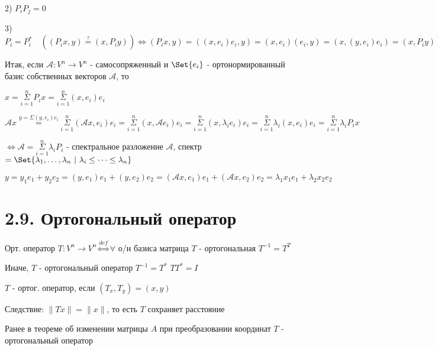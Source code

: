 \documentclass[12pt]{article}
\begin{document}
    2) $\displaystyle P_i P_j = 0$

    3) $\displaystyle P_i = P_i^* \quad ((P_i x, y) \stackrel{?}{=} (x, P_i y)) \Longleftrightarrow (P_i x, y) = ((x, e_i) e_i, y) = (x, e_i) (e_i, y) = (x, (y, e_i) e_i) = (x, P_i y)$

    Итак, если $\displaystyle \mathcal{A}: V^n \to V^n$ - самосопряженный и $\displaystyle \Set{e_i}$ - ортонормированный базис собственных векторов $\mathcal{A}$, то

    $\displaystyle x = \overset{n}{\underset{i = 1}{\Sigma}} P_i x = \overset{n}{\underset{i = 1}{\Sigma}} (x, e_i) e_i$

    $\displaystyle \mathcal{A} x \stackrel{y = \Sigma (y, e_i) e_i}{=} \overset{n}{\underset{i = 1}{\Sigma}} (\mathcal{A}x, e_i) e_i =
    \overset{n}{\underset{i = 1}{\Sigma}} (x, \mathcal{A}e_i) e_i = \overset{n}{\underset{i = 1}{\Sigma}} (x, \lambda_i e_i) e_i =
    \overset{n}{\underset{i = 1}{\Sigma}} \lambda_i (x, e_i) e_i = \overset{n}{\underset{i = 1}{\Sigma}} \lambda_i P_i x$

    $\displaystyle \Longleftrightarrow \mathcal{A} = \overset{n}{\underset{i = 1}{\Sigma}} \lambda_i P_i$ - спектральное разложение $\mathcal{A}$,
    спектр $\displaystyle = \Set{\lambda_1, \dots, \lambda_n \ | \ \lambda_i \leq \dots \leq \lambda_n}$

    \Ex

    $\displaystyle y = y_1 e_1 + y_2 e_2 = (y, e_1) e_1 + (y, e_2) e_2 = (\mathcal{A}x, e_1) e_1 + (\mathcal{A}x, e_2) e_2 = \lambda_1 x_1 e_1 + \lambda_2 x_2 e_2$

    \section[p2\_9]{2.9. Ортогональный оператор}

    \Mem Орт. оператор $\displaystyle T: V^n \to V^n \overset{def}{\Longleftrightarrow} \forall$ о/н базиса матрица $T$ - ортогональная $\displaystyle T^{-1} = T^T$

    \Nota Иначе, $T$ - ортогональный оператор \Longleftrightarrow $\displaystyle T^{-1} = T^*$ \Longrightarrow $\displaystyle T T^* = I$

    \Def $T$ - ортог. оператор, если $\displaystyle (T_x, T_y) = (x, y)$

    Следствие: $\|Tx\| = \|x\|$, то есть $T$ сохраняет расстояние

    \Nota Ранее в теореме об изменении матрицы $A$ при преобразовании координат $T$ - ортогональный оператор
\end{document}
